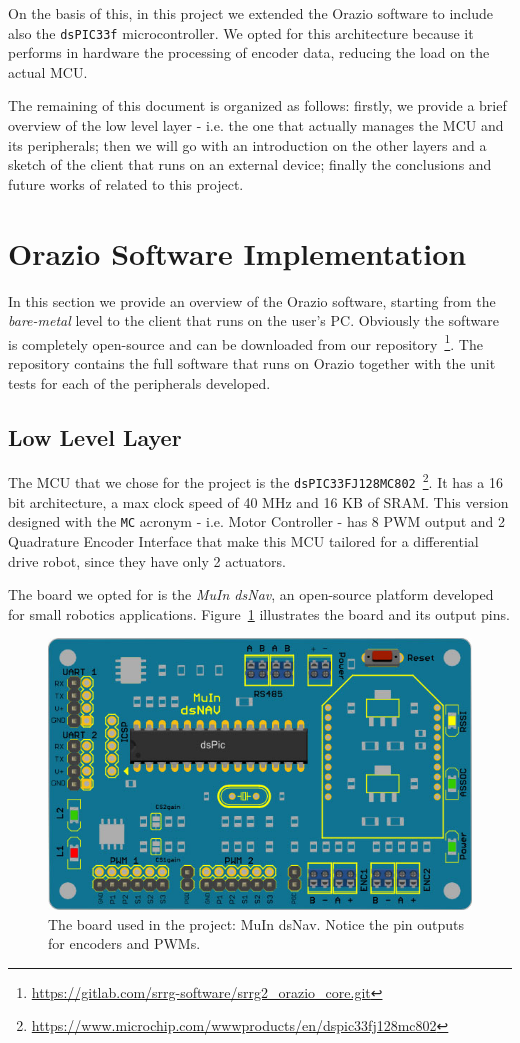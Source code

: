 \documentclass[10pt,a4paper, notitlepage]{report}
\begin{document}
On the basis of this, in this project we extended the Orazio software to include also the \texttt{dsPIC33f} microcontroller. We opted for this architecture because it performs in hardware the processing of encoder data, reducing the load on the actual MCU.

The remaining of this document is organized as follows: firstly, we provide a brief overview of the low level layer - i.e. the one that actually manages the MCU and its peripherals; then we will go with an introduction on the other layers and a sketch of the client that runs on an external device; finally the conclusions and future works of related to this project.

\section*{Orazio Software Implementation} \label{sec:approach}
In this section we provide an overview of the Orazio software, starting from the \textit{bare-metal} level to the client that runs on the user's PC. Obviously the software is completely open-source and can be downloaded from our repository~\footnote{\href{https://gitlab.com/srrg-software/srrg2_orazio_core.git}{https://gitlab.com/srrg-software/srrg2\_orazio\_core.git}}. The repository contains the full software that runs on Orazio together with the unit tests for each of the peripherals developed.
\subsection*{Low Level Layer}
The MCU that we chose for the project is the \texttt{dsPIC33FJ128MC802}~\footnote{\href{https://www.microchip.com/wwwproducts/en/dspic33fj128mc802}{https://www.microchip.com/wwwproducts/en/dspic33fj128mc802}}. It has a 16 bit architecture, a max clock speed of 40 MHz and 16 KB of SRAM. This version designed with the \texttt{MC} acronym - i.e. Motor Controller - has 8 PWM output and 2 Quadrature Encoder Interface that make this MCU tailored for a differential drive robot, since they have only 2 actuators.

The board we opted for is the \textit{MuIn dsNav}, an open-source platform developed for small robotics applications. Figure~\ref{fig:dsnav} illustrates the board and its output pins.

\begin{figure}[!h]
  \centering
  \includegraphics[width=0.6\linewidth]{pics/dsnav_simple}
  \caption{The board used in the project: MuIn dsNav. Notice the pin outputs for encoders and PWMs.}
  \label{fig:dsnav}
\end{figure}
\end{document}
